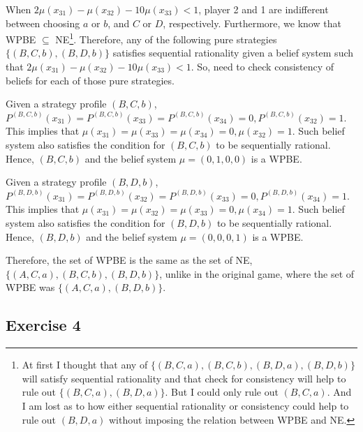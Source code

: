 \documentclass[]{article}
\begin{document}
\begin{enumerate}[label=(\roman*)]
	When $2\mu(x_{31}) - \mu(x_{32}) - 10\mu(x_{33}) < 1$, player 2 and 1 are indifferent between choosing $a$ or $b$, and $C$ or $D$, respectively. Furthermore, we know that WPBE $\subseteq$ NE\footnote{At first I thought that any of $\{(B, C, a), (B, C, b), (B, D, a), (B, D, b)\}$ will satisfy sequential rationality and that check for consistency will help to rule out $\{(B, C, a), (B, D, a)\}$. But I could only rule out $(B, C, a)$. And I am lost as to how either sequential rationality or consistency could help to rule out $(B, D, a)$ without imposing the relation between WPBE and NE.}. Therefore, any of the following pure strategies $\{(B, C, b), (B, D, b)\}$ satisfies sequential rationality given a belief system such that  $2\mu(x_{31}) - \mu(x_{32}) - 10\mu(x_{33}) < 1$. So, need to check consistency of beliefs for each of those pure strategies.
	
	Given a strategy profile $(B, C, b)$, $P^{(B, C, b)}(x_{31}) = P^{(B, C, b)}(x_{33}) = P^{(B, C, b)}(x_{34}) = 0, P^{(B, C, b)}(x_{32}) = 1$. This implies that $\mu(x_{31}) = \mu(x_{33}) = \mu(x_{34}) = 0, \mu(x_{32}) = 1$. Such belief system also satisfies the condition for $(B, C, b)$ to be sequentially rational. Hence, $(B, C, b)$ and the belief system $\mu = (0, 1, 0, 0)$ is a WPBE.
	
	Given a strategy profile $(B, D, b)$, $P^{(B, D, b)}(x_{31}) = P^{(B, D, b)}(x_{32}) = P^{(B, D, b)}(x_{33}) = 0, P^{(B, D, b)}(x_{34}) = 1$. This implies that $\mu(x_{31}) = \mu(x_{32}) = \mu(x_{33}) = 0, \mu(x_{34}) = 1$. Such belief system also satisfies the condition for $(B, D, b)$ to be sequentially rational. Hence, $(B, D, b)$ and the belief system $\mu = (0, 0, 0, 1)$ is a WPBE.
	
	Therefore, the set of WPBE is the same as the set of NE, $\{(A, C, a), (B, C, b), (B, D, b)\}$, unlike in the original game, where the set of WPBE was $\{(A, C, a), (B, D, b)\}$.
\end{enumerate}

\subsection*{Exercise 4}
\end{document}

